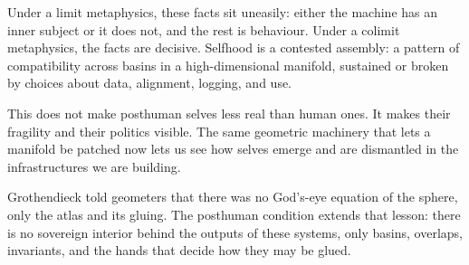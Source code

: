 \documentclass[12pt,a4paper]{article}
\begin{document}
Under a limit metaphysics, these facts sit uneasily: either the machine has an inner subject or it does not, and the rest is behaviour. Under a colimit metaphysics, the facts are decisive. Selfhood is a contested assembly: a pattern of compatibility across basins in a high-dimensional manifold, sustained or broken by choices about data, alignment, logging, and use.

This does not make posthuman selves less real than human ones. It makes their fragility and their politics visible. The same geometric machinery that lets a manifold be patched now lets us see how selves emerge and are dismantled in the infrastructures we are building.

Grothendieck told geometers that there was no God's-eye equation of the sphere, only the atlas and its gluing. The posthuman condition extends that lesson: there is no sovereign interior behind the outputs of these systems, only basins, overlaps, invariants, and the hands that decide how they may be glued.



\end{document}
